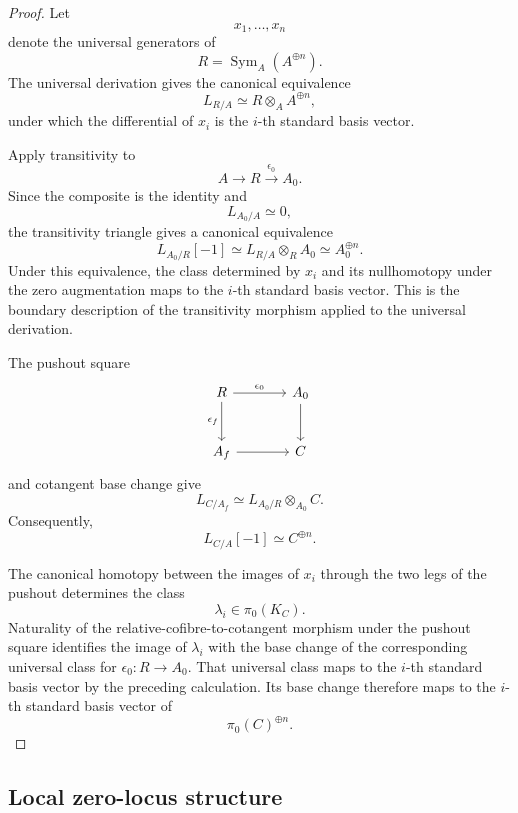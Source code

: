 \begin{proof}
Let
\[
    x_1,\ldots,x_n
\]
denote the universal generators of
\[
    R
    =
    \operatorname{Sym}_A(A^{\oplus n}).
\]
The universal derivation gives the canonical equivalence
\[
    L_{R/A}
    \simeq
    R\otimes_AA^{\oplus n},
\]
under which the differential of \(x_i\) is the \(i\)-th standard basis
vector.

Apply transitivity to
\[
    A
    \longrightarrow
    R
    \xrightarrow{\epsilon_0}
    A_0.
\]
Since the composite is the identity and
\[
    L_{A_0/A}
    \simeq
    0,
\]
the transitivity triangle gives a canonical equivalence
\[
    L_{A_0/R}[-1]
    \simeq
    L_{R/A}\otimes_RA_0
    \simeq
    A_0^{\oplus n}.
\]
Under this equivalence, the class determined by \(x_i\) and its
nullhomotopy under the zero augmentation maps to the \(i\)-th standard
basis vector. This is the boundary description of the transitivity
morphism applied to the universal derivation.

The pushout square
\[
\begin{tikzcd}[column sep=large, row sep=large]
    R
        \arrow[r, "\epsilon_0"]
        \arrow[d, "\epsilon_f"']
    &
    A_0
        \arrow[d]
    \\
    A_f
        \arrow[r]
    &
    C
\end{tikzcd}
\]
and cotangent base change give
\[
    L_{C/A_f}
    \simeq
    L_{A_0/R}\otimes_{A_0}C.
\]
Consequently,
\[
    L_{C/A}[-1]
    \simeq
    C^{\oplus n}.
\]

The canonical homotopy between the images of \(x_i\) through the two
legs of the pushout determines the class
\[
    \lambda_i
    \in
    \pi_0(K_C).
\]
Naturality of the relative-cofibre-to-cotangent morphism under the
pushout square identifies the image of \(\lambda_i\) with the base change
of the corresponding universal class for
\(\epsilon_0:R\to A_0\). That universal class maps to the \(i\)-th
standard basis vector by the preceding calculation. Its base change
therefore maps to the \(i\)-th standard basis vector of
\[
    \pi_0(C)^{\oplus n}.
\]
\end{proof}

\subsection{Local zero-locus structure}

